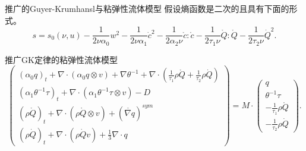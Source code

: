 \documentclass[mathserif]{beamer}
\begin{document}
\begin{frame}{推广的Guyer-Krumhansl与粘弹性流体模型}
\pause
假设熵函数是二次的且具有下面的形式。
	\begin{equation*}
		s = s_0(\nu,u)  - \frac{1}{2\nu \alpha_0} w^2 - \frac{1}{2\nu \alpha_1} \dot{c}^2- \frac{1}{2\alpha_2 \nu} \mathring{c}:\mathring{c} - \frac{1}{2 \tau_1 \nu} \mathring{Q}: \mathring{Q} - \frac{1}{2  \tau_2 \nu} \dot{Q}^2.
 	\end{equation*}  
\pause
\begin{block}{推广GK定律的粘弹性流体模型}
\begin{equation*}%
   	\left( %
   	\begin{smallmatrix}
			(\alpha_0 q)_t +  \nabla \cdot (\alpha_0  q \otimes v)  + \nabla \theta^{-1} + \nabla \cdot (\frac{1}{\tau_1} \rho \mathring{{Q}}+\frac{1}{\tau_2} \rho \dot{Q})\\
			(\alpha_1 \theta^{-1}\tau)_t +  \nabla \cdot (\alpha_1 \theta^{-1} \tau \otimes v)  - D \\
			(\rho \mathring{{Q}})_t + \nabla \cdot (\rho \mathring{Q} \otimes v)+(\mathring{\nabla {q}})^{sym} \\ (\rho \dot{Q})_t + \nabla \cdot (\rho \dot{Q} v)+\frac{1}{3} \nabla \cdot {q}
	\end{smallmatrix}	%
		\right) = M \cdot
		\left( %
		\begin{smallmatrix}
			q \\ \theta^{-1} \tau \\ -\frac{1}{\tau_1} \rho \mathring{{Q}} \\ -\frac{1}{\tau_2} \rho \dot{{Q}}
		\end{smallmatrix} %
		\right).
\end{equation*}
\end{block}

\end{frame}

\end{document}

